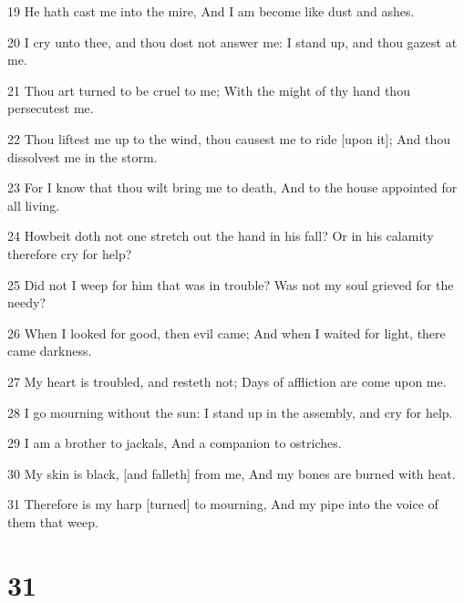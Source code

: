 \par 19 He hath cast me into the mire, And I am become like dust and ashes.
\par 20 I cry unto thee, and thou dost not answer me: I stand up, and thou gazest at me.
\par 21 Thou art turned to be cruel to me; With the might of thy hand thou persecutest me.
\par 22 Thou liftest me up to the wind, thou causest me to ride [upon it]; And thou dissolvest me in the storm.
\par 23 For I know that thou wilt bring me to death, And to the house appointed for all living.
\par 24 Howbeit doth not one stretch out the hand in his fall? Or in his calamity therefore cry for help?
\par 25 Did not I weep for him that was in trouble? Was not my soul grieved for the needy?
\par 26 When I looked for good, then evil came; And when I waited for light, there came darkness.
\par 27 My heart is troubled, and resteth not; Days of affliction are come upon me.
\par 28 I go mourning without the sun: I stand up in the assembly, and cry for help.
\par 29 I am a brother to jackals, And a companion to ostriches.
\par 30 My skin is black, [and falleth] from me, And my bones are burned with heat.
\par 31 Therefore is my harp [turned] to mourning, And my pipe into the voice of them that weep.

\chapter{31}

